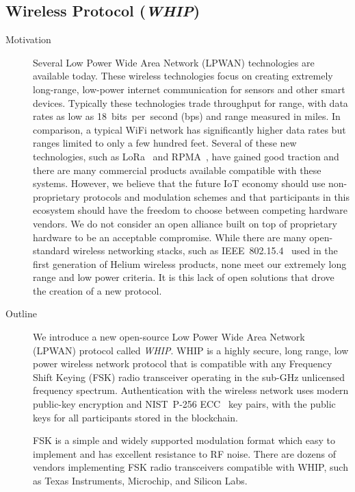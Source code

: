 \documentclass[letterpaper,11pt]{article}
\begin{document}
\subsection{Wireless Protocol (\emph{WHIP})}\label{whip}

\begin{description}
        \item [Motivation] Several Low Power Wide Area Network (LPWAN) technologies are available today. These wireless technologies focus on creating extremely long-range, low-power internet communication for sensors and other smart devices. Typically these technologies trade throughput for range, with data rates as low as 18~bits~per~second (bps) and range measured in miles. In comparison, a typical WiFi network has significantly higher data rates but ranges limited to only a few hundred feet. Several of these new technologies, such as LoRa~\cite{lora} and RPMA~\cite{rpma}, have gained good traction and there are many commercial products available compatible with these systems. However, we believe that the future IoT economy should use non-proprietary protocols and modulation schemes and that participants in this ecosystem should have the freedom to choose between competing hardware vendors. We do not consider an open alliance built on top of proprietary hardware to be an acceptable compromise. While there are many open-standard wireless networking stacks, such as IEEE~802.15.4~\cite{ieee802_15_4} used in the first generation of Helium wireless products, none meet our extremely long range and low power criteria. It is this lack of open solutions that drove the creation of a new protocol.

        \item [Outline] We introduce a new open-source Low Power Wide Area Network (LPWAN) protocol called \emph{WHIP}. WHIP is a highly secure, long range, low power wireless network protocol that is compatible with any Frequency Shift Keying (FSK) radio transceiver operating in the sub-GHz unlicensed frequency spectrum. Authentication with the wireless network uses modern public-key encryption and NIST~P-256 ECC~\cite{ecc} key pairs, with the public keys for all participants stored in the blockchain.

        FSK is a simple and widely supported modulation format which easy to implement and has excellent resistance to RF noise. There are dozens of vendors implementing FSK radio transceivers compatible with WHIP, such as Texas Instruments, Microchip, and Silicon Labs.


\end{description}
\end{document}
